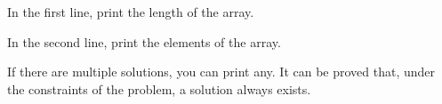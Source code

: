 In the first line, print the length of the array.

In the second line, print the elements of the array.

If there are multiple solutions, you can print any. It can be proved that,
under the constraints of the problem, a solution always exists.

\newpage